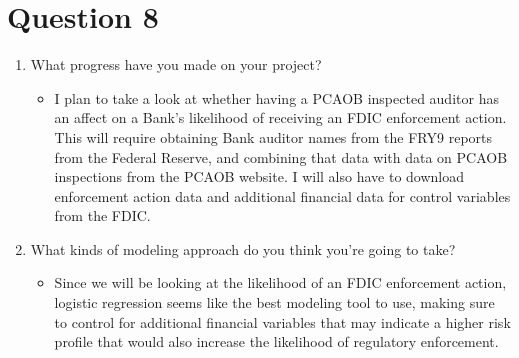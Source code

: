 \documentclass{article}
\begin{document}
\section*{Question 8}
\begin{enumerate}
    \item What progress have you made on your project?
    \begin{itemize}
        \item I plan to take a look at whether having a PCAOB inspected auditor has an affect on a Bank's likelihood of receiving an FDIC enforcement action. This will require obtaining Bank auditor names from the FRY9 reports from the Federal Reserve, and combining that data with data on PCAOB inspections from the PCAOB website. I will also have to download enforcement action data and additional financial data for control variables from the FDIC. 
    \end{itemize}
    \item What kinds of modeling approach do you think you're going to take?
    \begin{itemize}
        \item Since we will be looking at the likelihood of an FDIC enforcement action, logistic regression seems like the best modeling tool to use, making sure to control for additional financial variables that may indicate a higher risk profile that would also increase the likelihood of regulatory enforcement.
    \end{itemize}
\end{enumerate}
\end{document}
